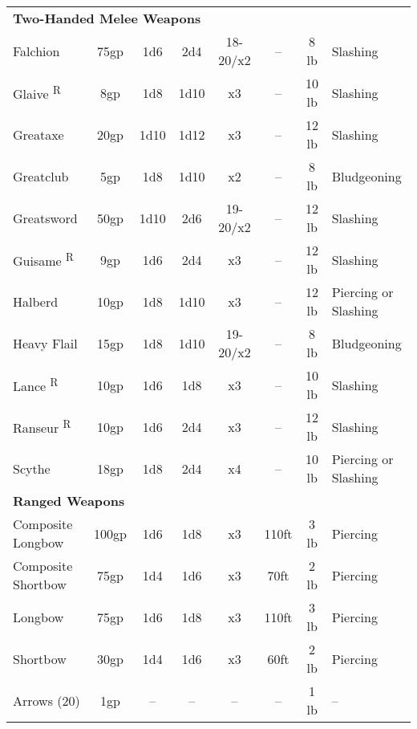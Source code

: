 \begin{table}[htb]
\begin{tabular}{l c c c c c c l}
\multicolumn{8}{l}{\textbf{Two-Handed Melee Weapons}}\\
\hspace{.5cm}Falchion & 75gp & 1d6 & 2d4 & 18-20/x2 & -- & 8 lb & Slashing\\
\hspace{.5cm}Glaive \textsuperscript{R} & 8gp & 1d8 & 1d10 & x3 & -- & 10 lb & Slashing\\
\hspace{.5cm}Greataxe & 20gp & 1d10 & 1d12 & x3 & -- & 12 lb & Slashing\\
\hspace{.5cm}Greatclub & 5gp & 1d8 & 1d10 & x2 & -- & 8 lb & Bludgeoning\\
\hspace{.5cm}Greatsword & 50gp & 1d10 & 2d6 & 19-20/x2 & -- & 12 lb & Slashing\\
\hspace{.5cm}Guisame \textsuperscript{R} & 9gp & 1d6 & 2d4 & x3 & -- & 12 lb & Slashing\\
\hspace{.5cm}Halberd & 10gp & 1d8 & 1d10 & x3 & -- & 12 lb & Piercing or Slashing\\
\hspace{.5cm}Heavy Flail & 15gp & 1d8 & 1d10 & 19-20/x2 & -- & 8 lb & Bludgeoning\\
\hspace{.5cm}Lance \textsuperscript{R} & 10gp & 1d6 & 1d8 & x3 & -- & 10 lb & Slashing\\
\hspace{.5cm}Ranseur \textsuperscript{R} & 10gp & 1d6 & 2d4 & x3 & -- & 12 lb & Slashing\\
\hspace{.5cm}Scythe & 18gp & 1d8 & 2d4 & x4 & -- & 10 lb & Piercing or Slashing\\

\multicolumn{8}{l}{\textbf{Ranged Weapons}}\\
\hspace{.5cm}Composite Longbow & 100gp & 1d6 & 1d8 & x3 & 110ft & 3 lb & Piercing\\
\hspace{.5cm}Composite Shortbow & 75gp & 1d4 & 1d6 & x3 & 70ft & 2 lb & Piercing\\
\hspace{.5cm}Longbow & 75gp & 1d6 & 1d8 & x3 & 110ft & 3 lb & Piercing\\
\hspace{.5cm}Shortbow & 30gp & 1d4 & 1d6 & x3 & 60ft & 2 lb & Piercing\\
\hspace{1cm}Arrows (20) & 1gp & -- & -- & -- & -- & 1 lb & --\\


\end{tabular}
\end{table}
